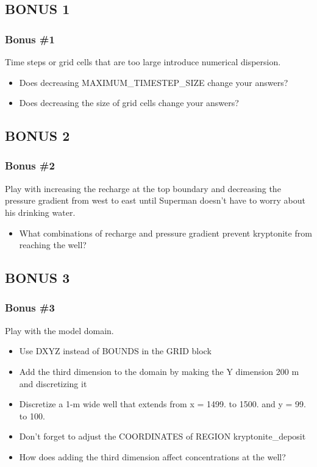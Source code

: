 \documentclass{beamer}
\begin{document}
\subsection{BONUS 1}

\begin{frame}[fragile]\frametitle{Bonus \#1}
Time steps or grid cells that are too large introduce numerical dispersion.

\begin{itemize}
  \item Does decreasing MAXIMUM\_TIMESTEP\_SIZE change your answers?
  \item Does decreasing the size of grid cells change your answers?
\end{itemize}

\end{frame}

\subsection{BONUS 2}

\begin{frame}[fragile]\frametitle{Bonus \#2}
Play with increasing the recharge at the top boundary and decreasing the pressure gradient from west to east until Superman doesn't have to worry about his drinking water. 

\begin{itemize}
  \item What combinations of recharge and pressure gradient prevent kryptonite from reaching the well?
\end{itemize}

\end{frame}

\subsection{BONUS 3}

\begin{frame}[fragile]\frametitle{Bonus \#3}
Play with the model domain.

\begin{itemize}
  \item Use DXYZ instead of BOUNDS in the GRID block
  \item Add the third dimension to the domain by making the Y dimension 200 m and discretizing it
  \item Discretize a 1-m wide well that extends from x = 1499. to 1500. and y = 99. to 100.
  \item Don't forget to adjust the COORDINATES of REGION kryptonite\_deposit
  \item How does adding the third dimension affect concentrations at the well?
\end{itemize}

\end{frame}
\end{document}
